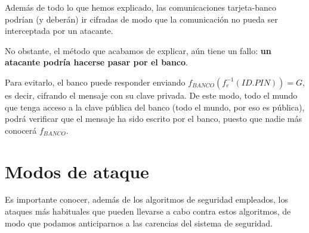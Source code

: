 Además de todo lo que hemos explicado, las comunicaciones tarjeta-banco podrían (y deberán) ir cifradas de modo que la comunicación no pueda ser interceptada por un atacante.

No obstante, el método que acabamos de explicar, aún tiene un fallo: \textbf{un atacante podría hacerse pasar por el banco}. 

Para evitarlo, el banco puede responder enviando $f_{BANCO}(f_e^{-1}(ID.PIN))=G$, es decir, cifrando el mensaje con su clave privada. De este modo, todo el mundo que tenga acceso a la clave pública del banco (todo el mundo, por eso es pública), podrá verificar que el mensaje ha sido escrito por el banco, puesto que nadie más conocerá $f_{BANCO}$.

\section{Modos de ataque}

Es importante conocer, además de los algoritmos de seguridad empleados, los ataques más habituales que pueden llevarse a cabo contra estos algoritmos, de modo que podamos anticiparnos a las carencias del sistema de seguridad.

